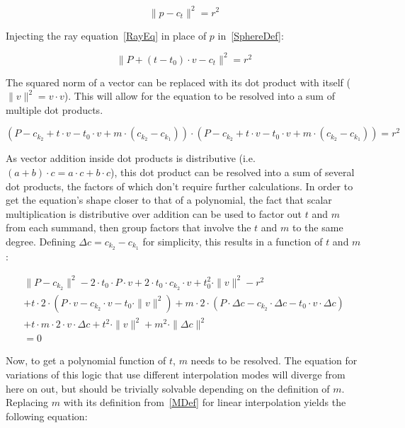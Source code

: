\begin{equation}\label{SphereDef}
    \|p-c_t\|^2 = r^2
\end{equation}

Injecting the ray equation~\eqref{RayEq} in place of \(p\) in~\eqref{SphereDef}:

\begin{equation}
    \|P + (t - t_0) \cdot v - c_t\|^2 = r^2
\end{equation}

The squared norm of a vector can be replaced with its dot product with itself (\(\|v\|^2 = v \cdot v \)).
This will allow for the equation to be resolved into a sum of multiple dot products.

\begin{equation*}
    (P - c_{k_2} + t \cdot v - t_0 \cdot v + m \cdot (c_{k_2} - c_{k_1})) \cdot (P - c_{k_2} + t \cdot v - t_0 \cdot v + m \cdot (c_{k_2} - c_{k_1})) = r^2
\end{equation*}

As vector addition inside dot products is distributive (i.e.\ \((a + b) \cdot c = a \cdot c + b \cdot c\)),
this dot product can be resolved into a sum of several dot products,
the factors of which don't require further calculations.
In order to get the equation's shape closer to that of a polynomial,
the fact that scalar multiplication is distributive over addition can be used
to factor out \(t\) and \(m\) from each summand,
then group factors that involve the \(t\) and \(m\) to the same degree.
Defining \(\Delta c = c_{k_2} - c_{k_1}\) for simplicity, this results in a function of \(t\) and \(m\):

\begin{equation}\label{SphereBeforeM}
    \begin{split}
        \|P - c_{k_2}\|^2
        - 2 \cdot t_0 \cdot P \cdot v
        + 2 \cdot t_0 \cdot c_{k_2} \cdot v
        + t_0^2 \cdot \|v\|^2
        - r^2
        \\
        + t \cdot 2 \cdot (P \cdot v - c_{k_2} \cdot v - t_0 \cdot \|v\|^2)
        + m \cdot 2 \cdot (P \cdot \Delta c - c_{k_2} \cdot \Delta c - t_0 \cdot v \cdot \Delta c)
        \\
        + t \cdot m \cdot 2 \cdot v \cdot \Delta c
        + t^2 \cdot \|v\|^2
        + m^2 \cdot \|\Delta c\|^2
        \\
        = 0
    \end{split}
\end{equation}

Now, to get a polynomial function of \(t\), \(m\) needs to be resolved.
The equation for variations of this logic that use different interpolation modes will diverge from here on out,
but should be trivially solvable depending on the definition of \(m\).
Replacing \(m\) with its definition from~\eqref{MDef} for linear interpolation yields the following equation:

